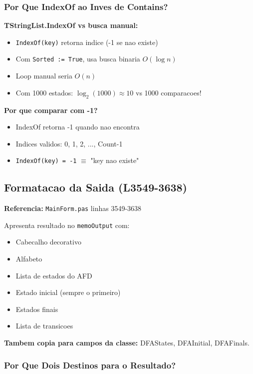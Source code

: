 \documentclass[12pt,a4paper]{article}
\begin{document}
\subsubsection{Por Que IndexOf ao Inves de Contains?}

\textbf{TStringList.IndexOf vs busca manual:}
\begin{itemize}
    \item \texttt{IndexOf(key)} retorna indice (-1 se nao existe)
    \item Com \texttt{Sorted := True}, usa busca binaria $O(\log n)$
    \item Loop manual seria $O(n)$
    \item Com 1000 estados: $\log_2(1000) \approx 10$ vs 1000 comparacoes!
\end{itemize}

\textbf{Por que comparar com -1?}
\begin{itemize}
    \item IndexOf retorna -1 quando nao encontra
    \item Indices validos: 0, 1, 2, ..., Count-1
    \item \texttt{IndexOf(key) = -1} $\equiv$ "key nao existe"
\end{itemize}

\subsection{Formatacao da Saida (L3549-3638)}

\textbf{Referencia:} \texttt{MainForm.pas} linhas 3549-3638

Apresenta resultado no \texttt{memoOutput} com:
\begin{itemize}
    \item Cabecalho decorativo
    \item Alfabeto
    \item Lista de estados do AFD
    \item Estado inicial (sempre o primeiro)
    \item Estados finais
    \item Lista de transicoes
\end{itemize}

\textbf{Tambem copia para campos da classe:} DFAStates, DFAInitial, DFAFinals.

\subsubsection{Por Que Dois Destinos para o Resultado?}
\end{document}
